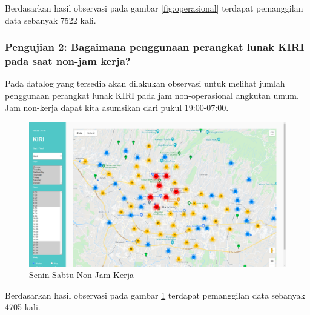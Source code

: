 Berdasarkan hasil observasi pada gambar \ref{fig:operasional} terdapat pemanggilan data sebanyak 7522 kali.


\subsubsection{Pengujian 2: Bagaimana penggunaan perangkat lunak KIRI pada saat non-jam kerja?}
\label{subsec:pengujian2}
Pada datalog yang tersedia akan dilakukan observasi untuk melihat jumlah penggunaan perangkat lunak KIRI pada jam non-operasional angkutan umum. Jam non-kerja dapat kita asumsikan dari pukul  19:00-07:00.
\begin{figure}[H]
	\centering  
	\includegraphics[scale=0.3]{Gambar/pengujian/senin-sabtu-non-operasional.png}  
	\caption[Senin-Sabtu Non Operasional]{Senin-Sabtu Non Jam Kerja} 
	\label{fig:nonOperasional}
\end{figure}

Berdasarkan hasil observasi pada gambar \ref{fig:nonOperasional} terdapat pemanggilan data sebanyak 4705 kali.

